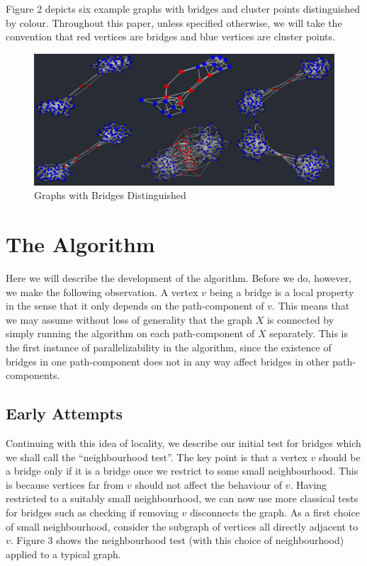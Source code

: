 \documentclass[12pt,a4paper]{amsart}
\numberwithin{equation}{section}
\theoremstyle{plain}
\theoremstyle{definition}
\begin{document}
Figure 2 depicts six example graphs with bridges and cluster points distinguished by colour. Throughout this paper, unless specified otherwise, we will take the convention that red vertices are bridges and blue vertices are cluster points.

\begin{figure}[h]
	\caption{Graphs with Bridges Distinguished}
	\centering
	\includegraphics[scale=0.5]{Figure 1.jpg}
\end{figure}

\newpage

\section{The Algorithm}

Here we will describe the development of the algorithm. Before we do, however, we make the following observation. A vertex $v$ being a bridge is a local property in the sense that it only depends on the path-component of $v$. This means that we may assume without loss of generality that the graph $X$ is connected by simply running the algorithm on each path-component of $X$ separately. This is the first instance of parallelizability in the algorithm, since the existence of bridges in one path-component does not in any way affect bridges in other path-components.

\subsection{Early Attempts}

Continuing with this idea of locality, we describe our initial test for bridges which we shall call the ``neighbourhood test''. The key point is that a vertex $v$ should be a bridge only if it is a bridge once we restrict to some small neighbourhood. This is because vertices far from $v$ should not affect the behaviour of $v$. Having restricted to a suitably small neighbourhood, we can now use more classical tests for bridges such as checking if removing $v$ disconnects the graph. As a first choice of small neighbourhood, consider the subgraph of vertices all directly adjacent to $v$. Figure 3 shows the neighbourhood test (with this choice of neighbourhood) applied to a typical graph.
\end{document}
